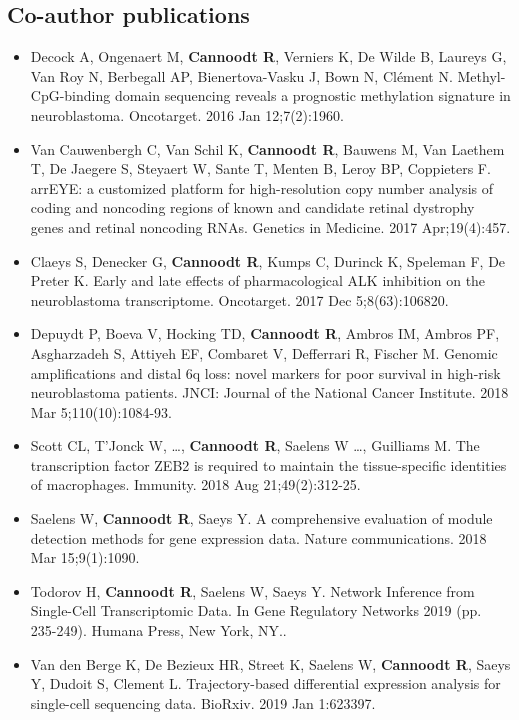 \subsection{Co-author publications}
\begin{itemize}
  \item Decock A, Ongenaert M, \textbf{Cannoodt R}, Verniers K, De Wilde B, Laureys G, Van Roy N, Berbegall AP, Bienertova-Vasku J, Bown N, Clément N. Methyl-CpG-binding domain sequencing reveals a prognostic methylation signature in neuroblastoma. Oncotarget. 2016 Jan 12;7(2):1960.
  \item Van Cauwenbergh C, Van Schil K, \textbf{Cannoodt R}, Bauwens M, Van Laethem T, De Jaegere S, Steyaert W, Sante T, Menten B, Leroy BP, Coppieters F. arrEYE: a customized platform for high-resolution copy number analysis of coding and noncoding regions of known and candidate retinal dystrophy genes and retinal noncoding RNAs. Genetics in Medicine. 2017 Apr;19(4):457.
  \item Claeys S, Denecker G, \textbf{Cannoodt R}, Kumps C, Durinck K, Speleman F, De Preter K. Early and late effects of pharmacological ALK inhibition on the neuroblastoma transcriptome. Oncotarget. 2017 Dec 5;8(63):106820.
  \item Depuydt P, Boeva V, Hocking TD, \textbf{Cannoodt R}, Ambros IM, Ambros PF, Asgharzadeh S, Attiyeh EF, Combaret V, Defferrari R, Fischer M. Genomic amplifications and distal 6q loss: novel markers for poor survival in high-risk neuroblastoma patients. JNCI: Journal of the National Cancer Institute. 2018 Mar 5;110(10):1084-93.
  \item Scott CL, T'Jonck W, \ldots, \textbf{Cannoodt R}, Saelens W \ldots, Guilliams M. The transcription factor ZEB2 is required to maintain the tissue-specific identities of macrophages. Immunity. 2018 Aug 21;49(2):312-25.
  \item Saelens W, \textbf{Cannoodt R}, Saeys Y. A comprehensive evaluation of module detection methods for gene expression data. Nature communications. 2018 Mar 15;9(1):1090.
  \item Todorov H, \textbf{Cannoodt R}, Saelens W, Saeys Y. Network Inference from Single-Cell Transcriptomic Data. In Gene Regulatory Networks 2019 (pp. 235-249). Humana Press, New York, NY..
  \item Van den Berge K, De Bezieux HR, Street K, Saelens W, \textbf{Cannoodt R}, Saeys Y, Dudoit S, Clement L. Trajectory-based differential expression analysis for single-cell sequencing data. BioRxiv. 2019 Jan 1:623397.

\end{itemize}
